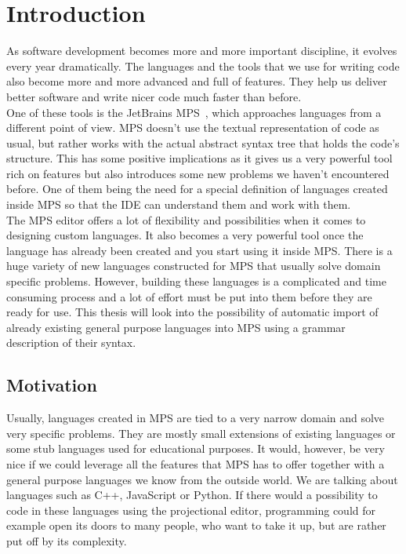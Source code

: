 \chapter{Introduction}

As software development becomes more and more important discipline, it evolves every year dramatically.
The languages and the tools that we use for writing code also become more and more advanced and full of features.
They help us deliver better software and write nicer code much faster than before.
\\

One of these tools is the JetBrains MPS~\cite{MPS}, which approaches languages from a different point of view.
MPS doesn't use the textual representation of code as usual, but rather works with the actual abstract syntax tree that holds the code's structure.
This has some positive implications as it gives us a very powerful tool rich on features but also introduces some new problems we haven't encountered before.
One of them being the need for a special definition of languages created inside MPS so that the IDE can understand them and work with them.
\\

The MPS editor offers a lot of flexibility and possibilities when it comes to designing custom languages.
It also becomes a very powerful tool once the language has already been created and you start using it inside MPS.
There is a huge variety of new languages constructed for MPS that usually solve domain specific problems.
However, building these languages is a complicated and time consuming process and a lot of effort must be put into them before they are ready for use.
This thesis will look into the possibility of automatic import of already existing general purpose languages into MPS using a grammar description of their syntax.

\section{Motivation}

Usually, languages created in MPS are tied to a very narrow domain and solve very specific problems.
They are mostly small extensions of existing languages or some stub languages used for educational purposes.
It would, however, be very nice if we could leverage all the features that MPS has to offer together with a general purpose languages we know from the outside world.
We are talking about languages such as C++, JavaScript or Python.
If there would a possibility to code in these languages using the projectional editor, programming could for example open its doors to many people, who want to take it up, but are rather put off by its complexity.
\\

